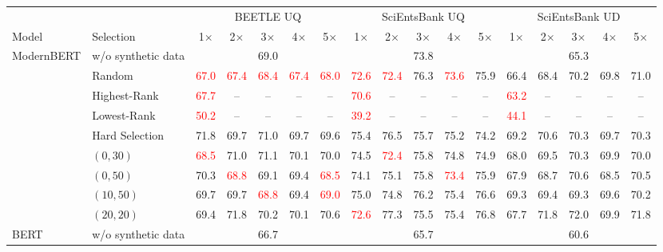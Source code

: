 \begin{table}[t]
\centering
\footnotesize
\setlength{\tabcolsep}{2pt}
\begin{tabular}{llccccccccccccccc}
\toprule
 & & \multicolumn{5}{c}{BEETLE UQ} & \multicolumn{5}{c}{SciEntsBank UQ} & \multicolumn{5}{c}{SciEntsBank UD} \\
\cmidrule(lr){3-7}\cmidrule(lr){8-12}\cmidrule(lr){13-17}
Model & Selection & 1$\times$ & 2$\times$ & 3$\times$ & 4$\times$ & 5$\times$ & 1$\times$ & 2$\times$ & 3$\times$ & 4$\times$ & 5$\times$ & 1$\times$ & 2$\times$ & 3$\times$ & 4$\times$ & 5$\times$ \\
\midrule
\multirow{9}{*}{ModernBERT} & w/o synthetic data & \multicolumn{5}{c}{69.0} & \multicolumn{5}{c}{73.8} & \multicolumn{5}{c}{65.3} \\
 & Random & \textcolor{red}{67.0} & \textcolor{red}{67.4} & \textcolor{red}{68.4} & \textcolor{red}{67.4} & \textcolor{red}{68.0} & \textcolor{red}{72.6} & \textcolor{red}{72.4} & 76.3 & \textcolor{red}{73.6} & 75.9 & 66.4 & 68.4 & 70.2 & 69.8 & 71.0 \\
 & Highest-Rank & \textcolor{red}{67.7} & -- & -- & -- & -- & \textcolor{red}{70.6} & -- & -- & -- & -- & \textcolor{red}{63.2} & -- & -- & -- & -- \\
 & Lowest-Rank & \textcolor{red}{50.2} & -- & -- & -- & -- & \textcolor{red}{39.2} & -- & -- & -- & -- & \textcolor{red}{44.1} & -- & -- & -- & -- \\
 & Hard Selection & 71.8 & 69.7 & 71.0 & 69.7 & 69.6 & 75.4 & 76.5 & 75.7 & 75.2 & 74.2 & 69.2 & 70.6 & 70.3 & 69.7 & 70.3 \\
 & $(0, 30)$ & \textcolor{red}{68.5} & 71.0 & 71.1 & 70.1 & 70.0 & 74.5 & \textcolor{red}{72.4} & 75.8 & 74.8 & 74.9 & 68.0 & 69.5 & 70.3 & 69.9 & 70.0 \\
 & $(0, 50)$ & 70.3 & \textcolor{red}{68.8} & 69.1 & 69.4 & \textcolor{red}{68.5} & 74.1 & 75.1 & 75.8 & \textcolor{red}{73.4} & 75.9 & 67.9 & 68.7 & 70.6 & 68.5 & 70.5 \\
 & $(10, 50)$ & 69.7 & 69.7 & \textcolor{red}{68.8} & 69.4 & \textcolor{red}{69.0} & 75.0 & 74.8 & 76.2 & 75.4 & 76.6 & 69.3 & 69.4 & 69.3 & 69.6 & 70.2 \\
 & $(20, 20)$ & 69.4 & 71.8 & 70.2 & 70.1 & 70.6 & \textcolor{red}{72.6} & 77.3 & 75.5 & 75.4 & 76.8 & 67.7 & 71.8 & 72.0 & 69.9 & 71.8 \\
\midrule
\multirow{9}{*}{BERT} & w/o synthetic data & \multicolumn{5}{c}{66.7} & \multicolumn{5}{c}{65.7} & \multicolumn{5}{c}{60.6} \\

\end{tabular}
\end{table}
